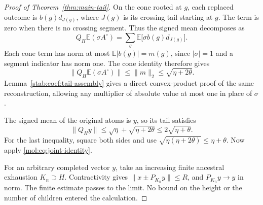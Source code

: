 \begin{proof}[Proof of Theorem~\ref{thm:main-tail}]
On the cone rooted at $g$, each replaced outcome is $b(g)d_{J(g)}$,
where $J(g)$ is its crossing tail starting at $g$.  The term is zero
when there is no crossing segment.  Thus the signed mean decomposes as
\begin{equation}\label{mol:eq:signed-product-recovery}
 Q_H\mathbb E(\sigma A^\circ)
 =\sum_g\mathbb E\bigl[\sigma b(g)d_{J(g)}\bigr].
\end{equation}
Each cone term has norm at most $\mathbb E|b(g)|=m(g)$, since
$|\sigma|=1$ and a segment indicator has norm one.  The cone identity
therefore gives
\[
 \|Q_H\mathbb E(\sigma A^\circ)\|
 \le\|m\|_2\le\sqrt{\eta+2\theta}.
\]
Lemma~\ref{stab:coef:tail-assembly} gives a direct convex-product proof
of the same reconstruction, allowing any multiplier of absolute value
at most one in place of $\sigma$.

The signed mean of the original atoms is $y$, so its tail satisfies
\[
 \|Q_Hy\|\le\sqrt\eta+\sqrt{\eta+2\theta}
 \le2\sqrt{\eta+\theta}.
\]
For the last inequality, square both sides and use
$\sqrt{\eta(\eta+2\theta)}\le\eta+\theta$.
Now apply \eqref{mol:eq:joint-identity}.

For an arbitrary completed vector $y$, take an increasing finite ancestral
exhaustion $K_n\supset H$.  Contractivity gives
$\|x\pm P_{K_n}y\|\le R$, and $P_{K_n}y\to y$ in norm.
The finite estimate passes to the limit.  No bound on the height or
the number of children entered the calculation.
\end{proof}
